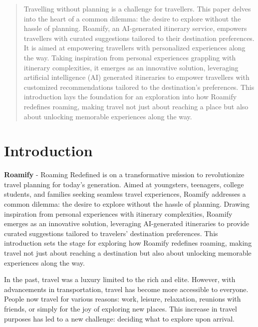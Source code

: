 \documentclass[conference]{IEEEtran}
\begin{document}
\begin{abstract}

    Travelling without planning is a challenge for travellers. This paper delves into the heart of a common dilemma: the desire to explore without the hassle of planning. Roamify, an AI-generated itinerary service, empowers travellers with curated suggestions tailored to their destination preferences. It is aimed at empowering travellers with personalized experiences along the way. Taking inspiration from personal experiences grappling with itinerary complexities, it emerges as an innovative solution, leveraging artificial intelligence (AI) generated itineraries to empower travellers with customized recommendations tailored to the destination's preferences. This introduction lays the foundation for an exploration into how Roamify redefines roaming, making travel not just about reaching a place but also about unlocking memorable experiences along the way.

\end{abstract}

\IEEEpeerreviewmaketitle

\section{Introduction}

\textbf{Roamify} - Roaming Redefined is on a transformative mission to revolutionize travel planning for today's generation. Aimed at youngsters, teenagers, college students, and families seeking seamless travel experiences, Roamify addresses a common dilemma: the desire to explore without the hassle of planning. Drawing inspiration from personal experiences with itinerary complexities, Roamify emerges as an innovative solution, leveraging AI-generated itineraries to provide curated suggestions tailored to travelers' destination preferences. This introduction sets the stage for exploring how Roamify redefines roaming, making travel not just about reaching a destination but also about unlocking memorable experiences along the way.

In the past, travel was a luxury limited to the rich and elite. However, with advancements in transportation, travel has become more accessible to everyone. People now travel for various reasons: work, leisure, relaxation, reunions with friends, or simply for the joy of exploring new places. This increase in travel purposes has led to a new challenge: deciding what to explore upon arrival.
\end{document}
